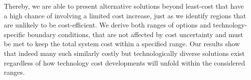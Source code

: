 
Thereby, we are able to present alternative solutions beyond least-cost that
have a high chance of involving a limited cost increase, just as we identify
regions that are unlikely to be cost-efficient. We derive both ranges of options
and technology-specific boundary conditions, that are not affected by cost
uncertainty and must be met to keep the total system cost within a specified
range. Our results show that indeed many such similarly costly but
technologically diverse solutions exist regardless of how technology cost
developments will unfold within the considered ranges.








